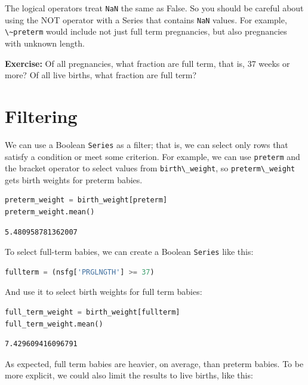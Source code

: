 The logical operators treat \passthrough{\lstinline!NaN!} the same as
False. So you should be careful about using the NOT operator with a
Series that contains \passthrough{\lstinline!NaN!} values. For example,
\passthrough{\lstinline!\~preterm!} would include not just full term
pregnancies, but also pregnancies with unknown length.

\textbf{Exercise:} Of all pregnancies, what fraction are full term, that
is, 37 weeks or more? Of all live births, what fraction are full term?

\hypertarget{filtering}{%
\section{Filtering}\label{filtering}}

We can use a Boolean \passthrough{\lstinline!Series!} as a filter; that
is, we can select only rows that satisfy a condition or meet some
criterion. For example, we can use \passthrough{\lstinline!preterm!} and
the bracket operator to select values from
\passthrough{\lstinline!birth\_weight!}, so
\passthrough{\lstinline!preterm\_weight!} gets birth weights for preterm
babies.

\begin{lstlisting}[language=Python]
preterm_weight = birth_weight[preterm]
preterm_weight.mean()
\end{lstlisting}

\begin{lstlisting}[]
5.480958781362007
\end{lstlisting}

To select full-term babies, we can create a Boolean
\passthrough{\lstinline!Series!} like this:

\begin{lstlisting}[language=Python]
fullterm = (nsfg['PRGLNGTH'] >= 37)
\end{lstlisting}

And use it to select birth weights for full term babies:

\begin{lstlisting}[language=Python]
full_term_weight = birth_weight[fullterm]
full_term_weight.mean()
\end{lstlisting}

\begin{lstlisting}[]
7.429609416096791
\end{lstlisting}

As expected, full term babies are heavier, on average, than preterm
babies. To be more explicit, we could also limit the results to live
births, like this:

